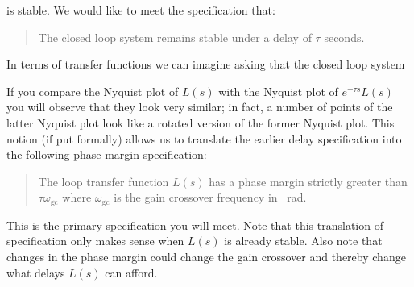%
is stable.
We would like to meet the specification that:
\begin{quote}
  The closed loop system remains stable under a delay of \(\tau\) seconds.
\end{quote}
In terms of transfer functions we can imagine asking that the closed loop system 
%
\begin{center}
\end{center}
%
If you compare the Nyquist plot of \(L(s)\) with the Nyquist plot of \(e^{-\tau s} L(s)\) you will observe that they look very similar;
in fact, a number of points of the latter Nyquist plot look like a rotated version of the former Nyquist plot.
This notion (if put formally) allows us to translate the earlier delay specification into the following phase margin specification: 
\begin{quote}
  The loop transfer function \(L(s)\) has a phase margin strictly greater than \(\tau \omega_{\mathrm{gc}}\) where \(\omega_{\mathrm{gc}}\) is the gain crossover frequency in \SI{}{\radian}.
\end{quote}
This is the primary specification you will meet.
Note that this translation of specification only makes sense when \(L(s)\) is already stable.
Also note that changes in the phase margin could change the gain crossover and thereby change what delays \(L(s)\) can afford.

